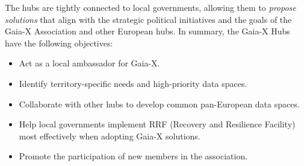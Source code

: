 The hubs are tightly connected to local governments, allowing them to \textit{propose solutions} that align with the strategic political initiatives and the goals of the Gaia-X Association and other European hubs.
In summary, the Gaia-X Hubs have the following objectives:
\begin{itemize}
    \item Act as a local ambassador for Gaia-X.
    \item Identify territory-specific needs and high-priority data spaces.
    \item Collaborate with other hubs to develop common pan-European data spaces.
    \item Help local governments implement RRF (Recovery and Resilience Facility) most effectively when adopting Gaia-X solutions.
    \item Promote the participation of new members in the association.
\end{itemize}
